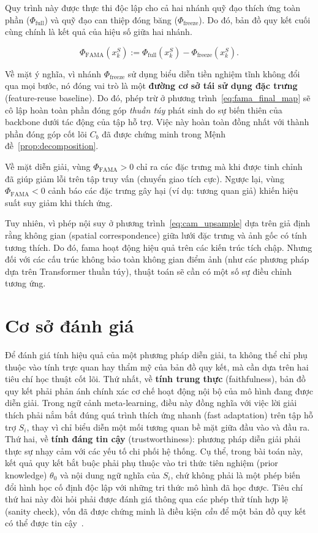 Quy trình này được thực thi độc lập cho cả hai nhánh quỹ đạo thích ứng toàn phần ($\Phi_{\text{full}}$) và quỹ đạo can thiệp đóng băng ($\Phi_{\text{freeze}}$). Do đó, bản đồ quy kết cuối cùng chính là kết quả của hiệu số giữa hai nhánh.

\begin{equation}
    \boxed{\Phi_{\text{FAMA}}(x_k^S) := \Phi_{\text{full}}(x_k^S) - \Phi_{\text{freeze}}(x_k^S).}
    \label{eq:fama_final_map}
\end{equation}

Về mặt ý nghĩa, vì nhánh $\Phi_{\text{freeze}}$ sử dụng biểu diễn tiền nghiệm tĩnh không đổi qua mọi bước, nó đóng vai trò là một \textbf{đường cơ sở tái sử dụng đặc trưng} (feature-reuse baseline). Do đó, phép trừ ở phương trình~\eqref{eq:fama_final_map} sẽ cô lập hoàn toàn phần đóng góp \emph{thuần túy} phát sinh do sự biến thiên của backbone dưới tác động của tập hỗ trợ. Việc này hoàn toàn đồng nhất với thành phần đóng góp cốt lõi $C_b$ đã được chứng minh trong Mệnh đề~\ref{prop:decomposition}.

Về mặt diễn giải, vùng $\Phi_{\text{FAMA}} > 0$ chỉ ra các đặc trưng mà khi được tinh chỉnh đã giúp giảm lỗi trên tập truy vấn (chuyển giao tích cực). Ngược lại, vùng $\Phi_{\text{FAMA}} < 0$ cảnh báo các đặc trưng gây hại (ví dụ: tương quan giả) khiến hiệu suất suy giảm khi thích ứng.

Tuy nhiên, vì phép nội suy ở phương trình~\eqref{eq:cam_upsample} dựa trên giả định rằng không gian (spatial correspondence) giữa lưới đặc trưng và ảnh gốc có tính tương thích. Do đó, \acrshort{fama} hoạt động hiệu quả trên các kiến trúc tích chập. Nhưng đối với các cấu trúc không bảo toàn không gian điểm ảnh (như các phương pháp dựa trên Transformer thuần túy), thuật toán sẽ cần có một số sự điều chỉnh tương ứng.

\section{Cơ sở đánh giá}
\label{sec:metrics}
Để đánh giá tính hiệu quả của một phương pháp diễn giải, ta không thể chỉ phụ thuộc vào tính trực quan hay thẩm mỹ của bản đồ quy kết, mà cần dựa trên hai tiêu chí học thuật cốt lõi. Thứ nhất, về \textbf{tính trung thực} (faithfulness), bản đồ quy kết phải phản ánh chính xác cơ chế hoạt động nội bộ của mô hình đang được diễn giải. Trong ngữ cảnh meta-learning, điều này đồng nghĩa với việc lời giải thích phải nắm bắt đúng quá trình thích ứng nhanh (fast adaptation) trên tập hỗ trợ $S_i$, thay vì chỉ biểu diễn một mối tương quan bề mặt giữa đầu vào và đầu ra. Thứ hai, về \textbf{tính đáng tin cậy} (trustworthiness): phương pháp diễn giải phải thực sự nhạy cảm với các yếu tố chi phối hệ thống. Cụ thể, trong bài toán này, kết quả quy kết bắt buộc phải phụ thuộc vào tri thức tiên nghiệm (prior knowledge) $\theta_0$ và nội dung ngữ nghĩa của $S_i$, chứ không phải là một phép biến đổi hình học cố định độc lập với những tri thức mô hình đã học được. Tiêu chí thứ hai này đòi hỏi phải được đánh giá thông qua các phép thử tính hợp lệ (sanity check), vốn đã được chứng minh là điều kiện \emph{cần} để một bản đồ quy kết có thể được tin cậy~\cite{adebayo2018sanity}.

